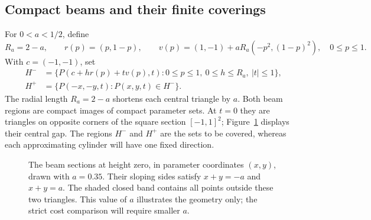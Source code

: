 \subsection{Compact beams and their finite coverings}

For $0<a<1/2$, define
\[
 R_a=2-a,\qquad r(p)=(p,1-p),\qquad
 v(p)=(1,-1)+aR_a(-p^2,(1-p)^2),\quad 0\le p\le1.
\]
With $c=(-1,-1)$, set
\begin{align*}
 H^-&=\{P(c+h r(p)+t v(p),t):0\le p\le1,\ 0\le h\le R_a,\ |t|\le1\},\\
 H^+&=\{P(-x,-y,t):P(x,y,t)\in H^-\}.
\end{align*}
The radial length $R_a=2-a$ shortens each central triangle by $a$.
Both beam regions are compact images of compact parameter sets.
At $t=0$ they are triangles on opposite corners of the square section
$[-1,1]^2$; Figure~\ref{beam:midsection} displays their central gap.
The regions $H^-$ and $H^+$ are the sets to be covered, whereas each
approximating cylinder will have one fixed direction.

\begin{figure}[htbp]
 \centering
 \caption{The beam sections at height zero, in parameter coordinates
 $(x,y)$, drawn with $a=0.35$. Their sloping sides satisfy
 $x+y=-a$ and $x+y=a$. The shaded closed band contains all points
 outside these two triangles. This value of $a$ illustrates the
 geometry only; the strict cost comparison will require smaller $a$.}
 \label{beam:midsection}
\end{figure}

